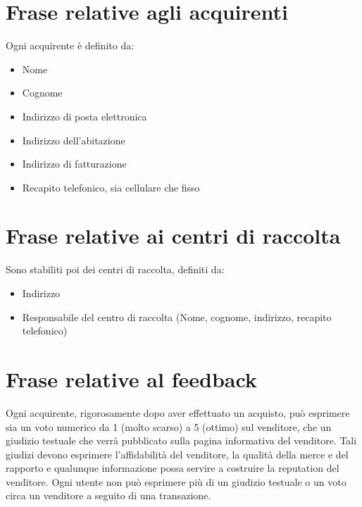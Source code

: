 \documentclass[a4paper, 10pt]{report}
\begin{document}
\section{Frase relative agli acquirenti}
Ogni acquirente \`e definito da:
\begin{itemize}
\item Nome
\item Cognome
\item Indirizzo di posta elettronica
\item Indirizzo dell'abitazione
\item Indirizzo di fatturazione
\item Recapito telefonico, sia cellulare che fisso
\end{itemize}

\section{Frase relative ai centri di raccolta}
Sono stabiliti poi dei centri di raccolta, definiti da:
\begin{itemize}
\item Indirizzo
\item Responsabile del centro di raccolta (Nome, cognome, indirizzo, recapito telefonico)
\end{itemize}

\section{Frase relative al feedback}
Ogni acquirente, rigorosamente dopo aver effettuato un acquisto, pu\`o esprimere sia un voto numerico da 1 (molto scarso) a 5 (ottimo) sul venditore, che un giudizio testuale che verr\`a pubblicato sulla pagina informativa del venditore. Tali giudizi devono esprimere l'affidabilit\`a del venditore, la qualit\`a della merce e del rapporto e qualunque informazione possa servire a costruire la reputation del venditore. Ogni utente non può esprimere più di un giudizio testuale o un voto circa un venditore a seguito di una transazione.
\end{document}
